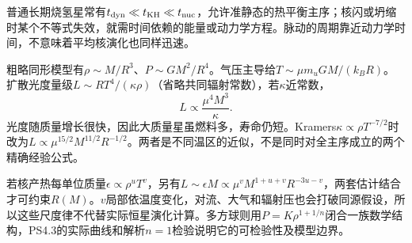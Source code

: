 普通长期烧氢星常有$t_{\rm dyn}\ll t_{\rm KH}\ll t_{\rm nuc}$，允许准静态的热平衡主序；核闪或坍缩时某个不等式失效，就需时间依赖的能量或动力学方程。脉动的周期靠近动力学时间，不意味着平均核演化也同样迅速。

粗略同形模型有$\rho\sim M/R^3$、$P\sim GM^2/R^4$。气压主导给$T\sim\mu m_u GM/(k_BR)$。扩散光度量级$L\sim RT^4/(\kappa\rho)$（省略共同辐射常数），若$\kappa$近常数，
\[
 L\propto\frac{\mu^4 M^3}{\kappa}.
\]
光度随质量增长很快，因此大质量星虽燃料多，寿命仍短。Kramers$\kappa\propto\rho T^{-7/2}$时改为$L\propto\mu^{15/2}M^{11/2}R^{-1/2}$。两者是不同温区的近似，不是同时对全主序成立的两个精确经验公式。

若核产热每单位质量$\epsilon\propto\rho^uT^v$，另有$L\sim\epsilon M\propto\mu^vM^{1+u+v}R^{-3u-v}$，两套估计结合才可约束$R(M)$。$v$局部依温度变化，对流、大气和辐射压也会打破同源假设，所以这些尺度律不代替实际恒星演化计算。多方球则用$P=K\rho^{1+1/n}$闭合一族数学结构，PS4.3的实际曲线和解析$n=1$检验说明它的可检验性及模型边界。
